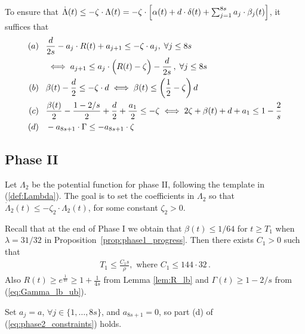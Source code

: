 \documentclass[a4paper,12pt]{article}
\begin{document}
To ensure that $\dot{\Lambda}(t) \leq - \zeta \cdot \Lambda(t) = - \zeta \cdot \Bigl[ \alpha(t) + d \cdot \delta(t) + \sum_{j=1}^{8s} a_j \cdot \beta_j(t) \Bigr]$, it suffices that
\begin{align} \label{eq:phase2_constraints}
(a) \; \; \; & \frac{d}{2s} - a_j \cdot R(t) + a_{j+1} \leq - \zeta \cdot a_j, \; \forall j \leq 8s  \notag \\
& \iff a_{j+1} \leq a_j \cdot \Bigl(R(t) - \zeta \Bigr) - \frac{d}{2s}\, , \; \forall j \leq 8s \notag \\
(b) \; \; \; & \beta(t) - \frac{d}{2}  \leq - \zeta \cdot d  \iff \beta(t) \leq \left( \frac{1}{2} - \zeta \right) d \notag\\
(c) \; \; \; & \frac{\beta(t)}{2} - \frac{1 - 2/s}{2} + \frac{d}{2} + \frac{a_1}{2} \leq - \zeta \iff 2 \zeta + \beta(t) + d + a_1 \leq 1 - \frac{2}{s} \notag \\
(d) \; \; \; & - a_{8s+1} \cdot \Gamma \leq - a_{8s+1} \cdot \zeta
\end{align}

\subsection{Phase II} \label{sec:phase_2}

Let $\Lambda_{2}$ be the potential function for phase II, following the template in (\ref{def:Lambda}). The goal is to set the coefficients in $\Lambda_{2}$ so that  $\dot{\Lambda}_{2}(t) \leq -\zeta_{2} \cdot \Lambda_{2}(t)$, for some constant $\zeta_{2}> 0$.

Recall that at the end of Phase I we obtain that $\beta(t) \leq 1/64$ for $t \geq T_1$ when $\lambda = 31/32$ in Proposition~\ref{prop:phase1_progress}. Then there exists $C_1 > 0$ such that
\begin{align}  %
T_1 \leq \frac{C_1 s}{\rho}, \mbox{ where } C_1 \leq 144 \cdot 32\,.
\end{align}
Also $R(t) \geq e^{\frac{1}{4s}} \geq 1 + \frac{1}{4s}$ from Lemma \ref{lem:R_lb} and $\Gamma(t) \geq 1 - 2/s$ from (\ref{eq:Gamma_lb_ub}).

\medskip

Set $a_j= a$, $\forall j \in \{1, \ldots, 8s\}$, and $a_{8s+1} = 0$, so part (d) of (\ref{eq:phase2_constraints}) holds.
\end{document}
